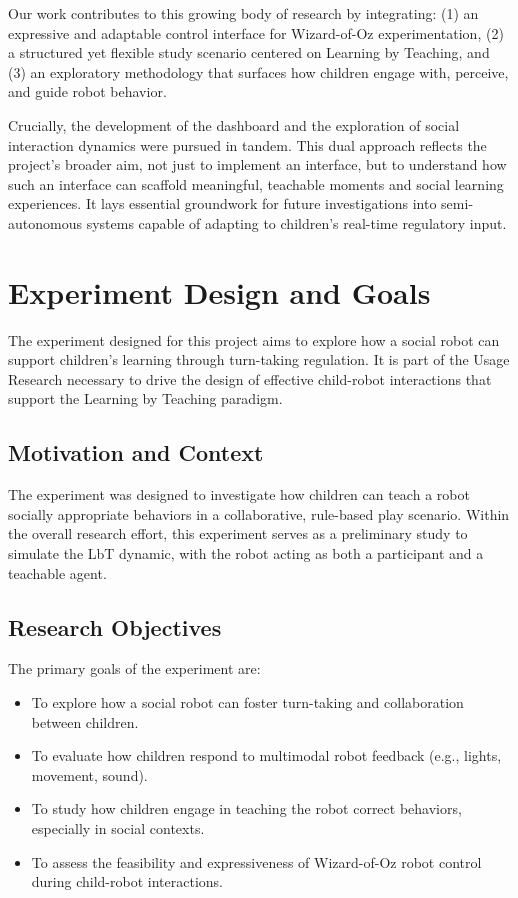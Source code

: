 \documentclass[a4paper]{usiinfbachelorproject}
\begin{document}
Our work contributes to this growing body of research by integrating:
(1) an expressive and adaptable control interface for Wizard-of-Oz experimentation,
(2) a structured yet flexible study scenario centered on Learning by Teaching, and
(3) an exploratory methodology that surfaces how children engage with, perceive, and guide robot behavior.

Crucially, the development of the dashboard and the exploration of social interaction dynamics were pursued in tandem.
This dual approach reflects the project's broader aim, not just to implement an interface, but to understand how such an interface can scaffold meaningful, teachable moments and social learning experiences.
It lays essential groundwork for future investigations into semi-autonomous systems capable of adapting to children's real-time regulatory input.

\section{\textbf{Experiment Design and Goals}}\label{sec:design}

The experiment designed for this project aims to explore how a social robot can support children's learning through turn-taking regulation.
It is part of the Usage Research necessary to drive the design of effective child-robot interactions that support the Learning by Teaching paradigm.

\subsection*{\textbf{Motivation and Context}}
The experiment was designed to investigate how children can teach a robot socially appropriate behaviors in a collaborative, rule-based play scenario.
Within the overall research effort, this experiment serves as a preliminary study to simulate the LbT dynamic, with the robot acting as both a participant and a teachable agent.

\subsection*{\textbf{Research Objectives}}
The primary goals of the experiment are:
\begin{itemize}
    \item To explore how a social robot can foster turn-taking and collaboration between children.
    \item To evaluate how children respond to multimodal robot feedback (e.g., lights, movement, sound).
    \item To study how children engage in teaching the robot correct behaviors, especially in social contexts.
    \item To assess the feasibility and expressiveness of Wizard-of-Oz robot control during child-robot interactions.
\end{itemize}
\end{document}
